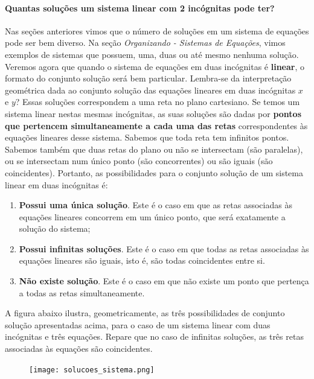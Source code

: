 \paragraph{Quantas soluções um sistema linear com 2 incógnitas pode ter?}

Nas seções anteriores vimos que o número de soluções em um sistema de equações pode ser bem diverso. Na seção \emph{Organizando - Sistemas de Equações}, vimos exemplos de sistemas que possuem, uma, duas ou até mesmo nenhuma solução. Veremos agora que quando o sistema de equações em duas incógnitas é \textbf{linear}, o formato do conjunto solução será bem particular. 
Lembra-se da interpretação geométrica dada ao conjunto solução das equações lineares em duas incógnitas $x$ e $y$? Essas soluções correspondem a uma reta no plano cartesiano. Se temos um sistema linear nestas mesmas incógnitas, as suas soluções são dadas por \textbf{pontos que pertencem simultaneamente a cada uma das retas} correspondentes às equações lineares desse sistema. Sabemos que toda reta tem infinitos pontos. Sabemos também que duas retas do plano ou não se intersectam (são paralelas), ou se intersectam num único ponto (são concorrentes) ou são iguais (são coincidentes). Portanto, as possibilidades para o conjunto solução de um sistema linear em duas incógnitas é:

\begin{enumerate}
\item{}
\textbf{Possui uma única solução}. Este é o caso em que as retas associadas às equações lineares concorrem em um único ponto, que será exatamente a solução do sistema;

\item{}
\textbf{Possui infinitas soluções}. Este é o caso em que todas as retas associadas às equações lineares são iguais, isto é, são todas coincidentes entre si.

\item{}
\textbf{Não existe solução}. Este é o caso em que não existe um ponto que pertença a todas as retas simultaneamente.


\end{enumerate}

A figura abaixo ilustra, geometricamente, as três possibilidades de conjunto solução apresentadas acima, para o caso de um sistema linear com duas incógnitas e três equações. Repare que no caso de infinitas soluções, as três retas associadas às equações são coincidentes.
\begin{figure}[H]
\centering
\noindent\texttt{[image: solucoes\_sistema.png]}
\end{figure}


